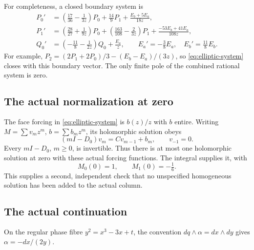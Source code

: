 \documentclass[11pt]{article}
\numberwithin{equation}{section}
\theoremstyle{definition}
\theoremstyle{remark}
\begin{document}
For completeness, a closed boundary system is
\begin{align}
 P_0'&=\left(\frac{17}{36}-\frac1{3z}\right)P_0+
       \frac{14}{9}P_1+\frac{E_b+5E_a}{18z},\\
 P_1'&=\left(\frac{28}{27}+\frac1{9z}\right)P_0+
       \left(\frac{163}{108}-\frac2{3z}\right)P_1+
       \frac{-53E_b+41E_a}{108z},\\
 Q_0'&=\left(-\frac{11}{8}-\frac1{2z}\right)Q_0+\frac{E_a}{z},
 \qquad E_a'=-\tfrac38 E_a,\quad E_b'=\tfrac{11}{8}E_b.
\end{align}
For example, $P_2=(2P_1+2P_0)/3-(E_b-E_a)/(3z)$, so
\eqref{eq:elliptic-system} closes with this boundary vector. The only
finite pole of the combined rational system is zero.

\subsection{The actual normalization at zero}
The face forcing in \eqref{eq:elliptic-system} is $b(z)/z$ with $b$ entire.
Writing $M=\sum v_mz^m$, $b=\sum b_mz^m$, its holomorphic solution obeys
\[
 (mI-D_0)v_m=Cv_{m-1}+b_m,\qquad v_{-1}=0.
\]
Every $mI-D_0$, $m\ge0$, is invertible. Thus there is at most one
holomorphic solution at zero with these actual forcing functions. The
integral supplies it, with
\[
 M_0(0)=1,\qquad M_1(0)=-\tfrac16.
\]
This supplies a second, independent check that no unspecified homogeneous
solution has been added to the actual column.

\subsection{The actual continuation}
On the regular phase fibre $y^2=x^3-3x+t$, the convention
$dq\wedge\alpha=dx\wedge dy$ gives $\alpha=-dx/(2y)$.
\end{document}
